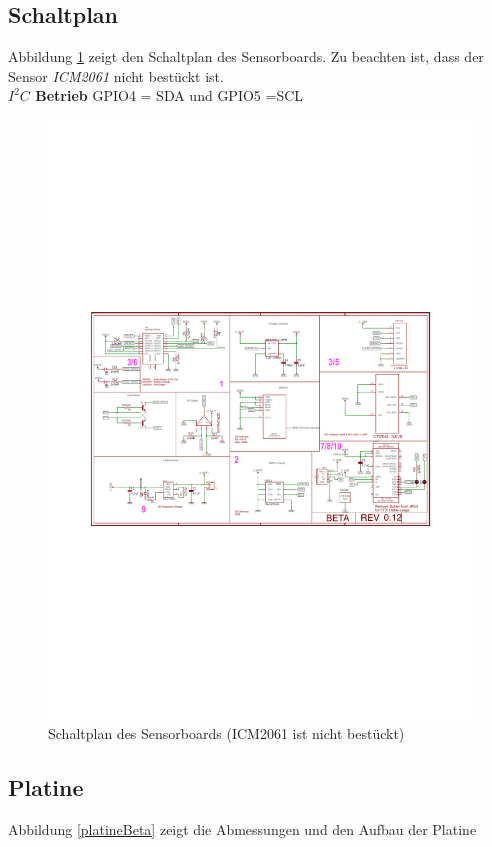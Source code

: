 \documentclass[10pt, a4paper, onecolumn]{article} %
\begin{document}
\subsection{Schaltplan}
Abbildung \ref{schematicBeta} zeigt den Schaltplan des Sensorboards. Zu beachten ist, dass der Sensor \emph{ICM2061 } nicht bestückt ist.\\ \textbf{$I^2C$ Betrieb}    GPIO4 = SDA und GPIO5 =SCL  
\begin{figure}[h]
	\centering
	\includegraphics[width=0.935\linewidth]{images/BetaICMschRev015}
	\caption{Schaltplan des Sensorboards (ICM2061 ist nicht bestückt)}
	\label{schematicBeta}
\end{figure}

\clearpage

\subsection{Platine}
Abbildung \ref{platineBeta} zeigt die Abmessungen und den Aufbau der Platine
\end{document}
